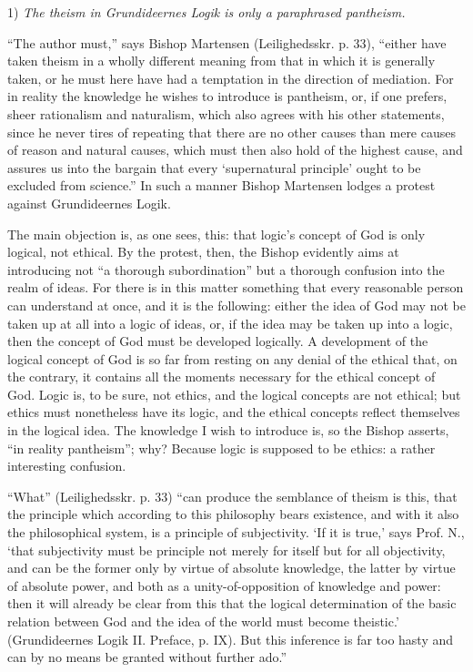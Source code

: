 \documentclass[12pt]{book}
\newcommand{\opage}[1]{\marginnote{\footnotesize\textit{[#1]}}}
\begin{document}
1) \emph{The theism in Grundideernes Logik is only a paraphrased pantheism.}

``The author must,'' says Bishop Martensen (Leilighedsskr. p. 33), ``either have taken theism in a wholly different meaning from that in which it is generally taken, or he must here have had a temptation in the direction of mediation. For in reality the knowledge he wishes to introduce is pantheism, or, if one prefers, sheer rationalism and naturalism, which also agrees with his other statements, since he never tires of repeating that there are no other causes than mere causes of reason and natural causes, which must then also hold of the highest cause, and assures us into the bargain that every `supernatural principle' ought to be excluded from science.'' In such a manner Bishop Martensen lodges a protest against Grundideernes Logik.

The main objection is, as one sees, this: that logic's concept of God is only logical, not ethical. By the protest, then, the Bishop evidently aims at introducing not ``a thorough subordination'' but a thorough confusion into the realm of ideas. For there is in this matter something that every reasonable person can understand at once, and it is the following: either the idea of God may not be taken up at all into a logic of ideas, or, if the idea may be taken up into a logic, then the concept of God must be developed logically. A development of the logical concept of God is so far from resting on any denial of the ethical that, on the contrary, it contains all the moments necessary for the ethical concept of God. Logic is, to be sure, not ethics, and the logical concepts are not ethical; but ethics must nonetheless have its logic, and the ethical concepts reflect themselves in the logical idea. The knowledge I wish to introduce is, so the Bishop asserts, ``in reality pantheism''; why? Because logic is supposed to be ethics: a rather interesting confusion.

\opage{119}\setcounter{footnote}{0}%
``What'' (Leilighedsskr. p. 33) ``can produce the semblance of theism is this, that the principle which according to this philosophy bears existence, and with it also the philosophical system, is a principle of subjectivity. `If it is true,' says Prof. N., `that subjectivity must be principle not merely for itself but for all objectivity, and can be the former only by virtue of absolute knowledge, the latter by virtue of absolute power, and both as a unity-of-opposition of knowledge and power: then it will already be clear from this that the logical determination of the basic relation between God and the idea of the world must become theistic.' (Grundideernes Logik II. Preface, p. IX). But this inference is far too hasty and can by no means be granted without further ado.''
\end{document}
